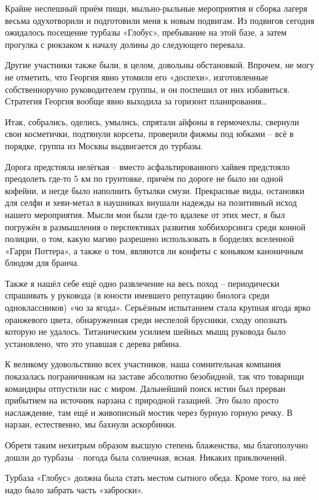 Крайне неспешный приём пищи, мыльно-рыльные мероприятия и сборка лагеря весьма одухотворили и подготовили меня к новым подвигам. Из подвигов сегодня ожидалось посещение турбазы «Глобус», пребывание на этой базе, а затем прогулка с рюкзаком к началу долины до следующего перевала. 

Другие участники также были, в целом, довольны обстановкой. Впрочем, не могу не отметить, что Георгия явно утомили его «доспехи», изготовленные собственноручно руководителем группы, и он поспешил от них избавиться. Стратегия Георгия вообще явно выходила за горизонт планирования…

Итак, собрались, оделись, умылись, спрятали айфоны в гермочехлы, свернули свои косметички, подтянули корсеты, проверили фижмы под юбками – всё в порядке, группа из Москвы выдвигается до турбазы. 

Дорога предстояла нелёгкая – вместо асфальтированного хайвея предстояло преодолеть где-то 5 км по грунтовке, причём по дороге не было ни одной кофейни, и негде было наполнить бутылки смузи.
Прекрасные виды, остановки для селфи и хеви-метал в наушниках внушали надежды на позитивный исход нашего мероприятия. Мысли мои были где-то вдалеке от этих мест, я был погружён в размышления о перспективах развития хоббихорсинга среди конной полиции, о том, какую магию разрешено использовать в борделях вселенной «Гарри Поттера», а также о том, являются ли конфеты с коньяком каноничным блюдом для бранча.

Также я нашёл себе ещё одно развлечение на весь поход – периодически спрашивать у руковода (в юности имевшего репутацию биолога среди одноклассников) «чо за ягода». Серьёзным испытанием стала крупная ягода ярко оранжевого цвета, обнаруженная среди неспелой брусники, сходу опознать которую не удалось. Титаническим усилием шейных мышц руковода было установлено, что это упавшая с дерева рябина.

К великому удовольствию всех участников, наша сомнительная компания показалась пограничникам на заставе абсолютно безобидной, так что товарищи командиры отпустили нас с миром. 
Дальнейший поиск истин был прерван прибытием на источник нарзана с природной газацией. Это было просто наслаждение, там ещё и живописный мостик через бурную горную речку. В нарзан, естественно, мы бахнули аскорбинки.

Обретя таким нехитрым образом высшую степень блаженства, мы благополучно дошли до турбазы – погода была солнечная, ясная. Никаких приключений.

Турбаза «Глобус» должна была стать местом сытного обеда. Кроме того, на неё надо было забрать часть «заброски». 

